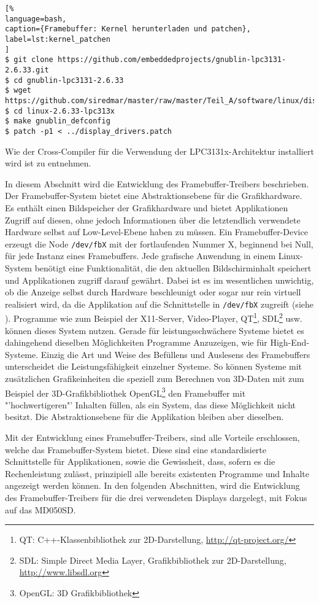 \begin{lstlisting}[%
language=bash,
caption={Framebuffer: Kernel herunterladen und patchen},
label=lst:kernel_patchen
]
$ git clone https://github.com/embeddedprojects/gnublin-lpc3131-2.6.33.git
$ cd gnublin-lpc3131-2.6.33
$ wget https://github.com/siredmar/master/raw/master/Teil_A/software/linux/display_drivers.patch
$ cd linux-2.6.33-lpc313x
$ make gnublin_defconfig
$ patch -p1 < ../display_drivers.patch
\end{lstlisting}
Wie der Cross-Compiler für die Verwendung der LPC3131x-Architektur installiert wird ist \cite{GnublinWiki2013c} zu entnehmen.

In diesem Abschnitt wird die Entwicklung des Framebuffer-Treibers beschrieben. Der Framebuffer-System bietet eine Abstraktionsebene für die Grafikhardware. Es enthält einen Bildspeicher der Grafikhardware und bietet Applikationen Zugriff auf diesen, ohne jedoch Informationen über die letztendlich verwendete Hardware selbst auf Low-Level-Ebene haben zu müssen. Ein Framebuffer-Device erzeugt die Node \lstinline|/dev/fbX| mit der fortlaufenden Nummer X, beginnend bei Null, für jede Instanz eines Framebuffers. Jede grafische Anwendung in einem Linux-System benötigt eine Funktionalität, die den aktuellen Bildschirminhalt speichert und  Applikationen zugriff darauf gewährt. Dabei ist es im wesentlichen unwichtig, ob die Anzeige selbst durch Hardware beschleunigt oder sogar nur rein virtuell realisiert wird, da die Applikation auf die Schnittstelle in \lstinline|/dev/fbX| zugreift (siehe  \cite{LinuxKernelFB}).
Programme wie zum Beispiel der X11-Server, Video-Player, QT\footnote{QT: C++-Klassenbibliothek zur 2D-Darstellung, \url{http://qt-project.org/}}, SDL\footnote{SDL: Simple Direct Media Layer, Grafikbibliothek zur 2D-Darstellung, \url{http://www.libsdl.org}} usw. können dieses System nutzen. Gerade für leistungsschwächere Systeme bietet es dahingehend dieselben Möglichkeiten Programme Anzuzeigen, wie für High-End-Systeme. Einzig die Art und Weise des Befüllens und Auslesens des Framebuffers unterscheidet die Leistungsfähigkeit einzelner Systeme. So können Systeme mit zusätzlichen Grafikeinheiten die speziell zum Berechnen von 3D-Daten mit zum Beispiel der 3D-Grafikbibliothek OpenGL\footnote{OpenGL: 3D Grafikbibliothek} den Framebuffer mit "'hochwertigeren"' Inhalten füllen, als ein System, das diese Möglichkeit nicht besitzt. Die Abstraktionsebene für die Applikation bleiben aber dieselben. 

Mit der Entwicklung eines Framebuffer-Treibers, sind alle Vorteile erschlossen, welche das Framebuffer-System bietet. Diese sind eine standardisierte Schnittstelle für Applikationen, sowie die Gewissheit, dass, sofern es die Rechenleistung zulässt, prinzipiell alle bereits existenten Programme und Inhalte angezeigt werden können.
In den folgenden Abschnitten, wird die Entwicklung des Framebuffer-Treibers für die drei verwendeten Displays dargelegt, mit Fokus auf das MD050SD. 
